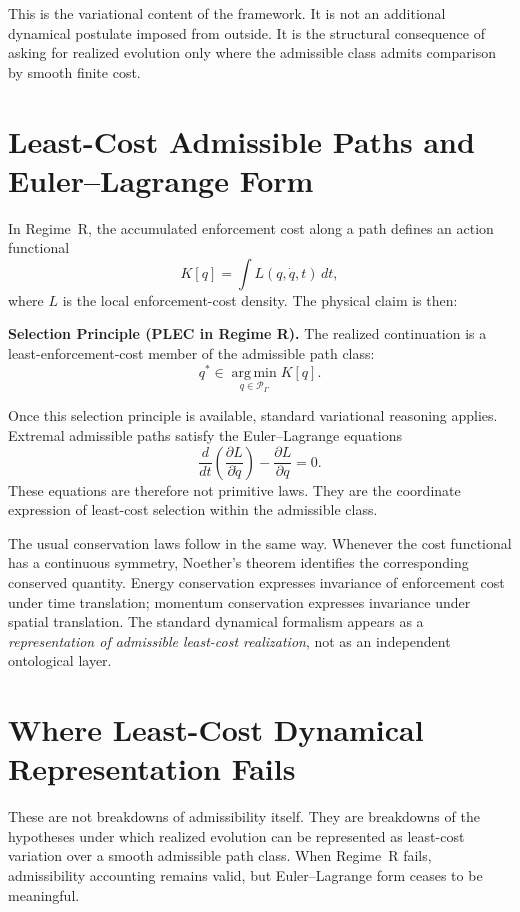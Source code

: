\documentclass[11pt]{article}
\begin{document}
This is the variational content of the framework. It is not an additional
dynamical postulate imposed from outside. It is the structural consequence of
asking for realized evolution only where the admissible class admits comparison
by smooth finite cost.

\section{Least-Cost Admissible Paths and Euler--Lagrange Form}\label{sec:EL}

In Regime~R, the accumulated enforcement cost along a path defines an action
functional
\[
K[q] = \int L(q,\dot q,t)\,dt,
\]
where $L$ is the local enforcement-cost density. The physical claim is then:

\begin{apfbox}
\textbf{Selection Principle (PLEC in Regime R).} The realized continuation is a
least-enforcement-cost member of the admissible path class:
\[
q^{\ast} \in \operatorname*{arg\,min}_{q \in \mathcal{P}_{\Gamma}} K[q].
\]
\end{apfbox}

Once this selection principle is available, standard variational reasoning
applies. Extremal admissible paths satisfy the Euler--Lagrange equations
\[
\frac{d}{dt}\left(\frac{\partial L}{\partial \dot q}\right) - \frac{\partial L}{\partial q} = 0.
\]
These equations are therefore not primitive laws. They are the coordinate
expression of least-cost selection within the admissible class.

The usual conservation laws follow in the same way. Whenever the cost functional
has a continuous symmetry, Noether's theorem identifies the corresponding
conserved quantity. Energy conservation expresses invariance of enforcement cost
under time translation; momentum conservation expresses invariance under spatial
translation. The standard dynamical formalism appears as a \emph{representation of
admissible least-cost realization}, not as an independent ontological layer.

\section{Where Least-Cost Dynamical Representation Fails}\label{sec:dyn-fails}

These are not breakdowns of admissibility itself. They are breakdowns of the
hypotheses under which realized evolution can be represented as least-cost
variation over a smooth admissible path class. When Regime~R fails,
admissibility accounting remains valid, but Euler--Lagrange form ceases to be
meaningful.
\end{document}
